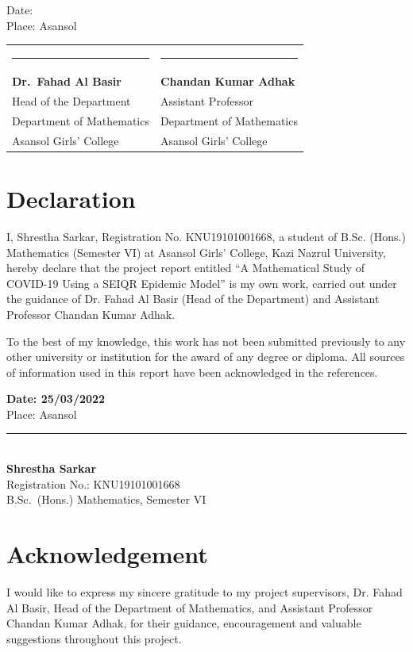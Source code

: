 \documentclass[12pt,a4paper]{article}
\theoremstyle{definition}
\begin{document}
\vspace{1em}
Date: \underline{\hspace{4cm}}\\[2pt]
Place: Asansol

\vspace{2.5cm}
\noindent
\begin{tabular}{@{}p{}p{}@{}}
\rule{6cm}{0.4pt} & \rule{6cm}{0.4pt}\\
\textbf{Dr.\ Fahad Al Basir} & \textbf{Chandan Kumar Adhak}\\
Head of the Department & Assistant Professor\\
Department of Mathematics & Department of Mathematics\\
Asansol Girls' College & Asansol Girls' College
\end{tabular}
\clearpage
\section*{Declaration}
I, Shrestha Sarkar, Registration No. KNU19101001668, a student of B.Sc. (Hons.) Mathematics (Semester VI) at Asansol Girls' College, Kazi Nazrul University, hereby declare that the project report entitled “A Mathematical Study of COVID-19 Using a SEIQR Epidemic Model” is my own work, carried out under the guidance of Dr. Fahad Al Basir (Head of the Department) and Assistant Professor Chandan Kumar Adhak.

To the best of my knowledge, this work has not been submitted previously to any other university or institution for the award of any degree or diploma. All sources of information used in this report have been acknowledged in the references.

\vspace{1.5em}
\textbf{Date: 25/03/2022}\\[2pt]
Place: Asansol

\vspace{1.5cm}
\hfill\begin{minipage}{0.5\textwidth}
\raggedleft
\rule{6cm}{0.4pt}\\
\textbf{Shrestha Sarkar}\\
Registration No.: KNU19101001668\\
B.Sc.\ (Hons.) Mathematics, Semester VI
\end{minipage}
\clearpage
\section*{Acknowledgement}
I would like to express my sincere gratitude to my project supervisors, Dr. Fahad Al Basir, Head of the Department of Mathematics, and Assistant Professor Chandan Kumar Adhak, for their guidance, encouragement and valuable suggestions throughout this project.
\end{document}

